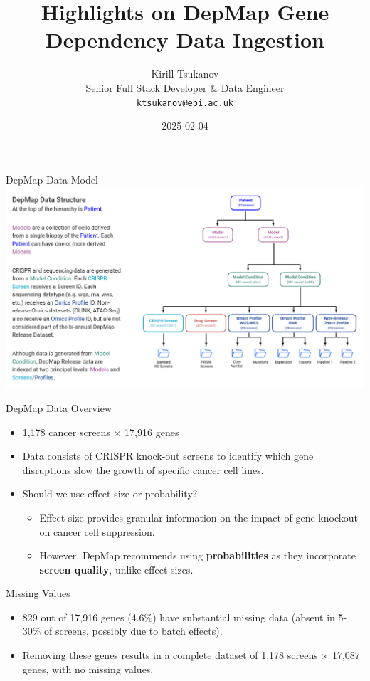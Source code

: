 \documentclass[handout]{beamer}
\title{Highlights on DepMap Gene Dependency Data Ingestion}
\date{2025-02-04}
\author{Kirill Tsukanov \\ Senior Full Stack Developer \& Data Engineer \\ \texttt{ktsukanov@ebi.ac.uk}}
\institute{Perturbation Catalogue WP1/2/3 Technical Meeting}
\begin{document}
\begin{frame}
    \titlepage
\end{frame}

\begin{frame}{DepMap Data Model}
    \centering
    \includegraphics[width=0.9\linewidth]{depmap_data_model.png}
\end{frame}

\begin{frame}{DepMap Data Overview}
    \begin{itemize}
        \item 1,178 cancer screens \(\times\) 17,916 genes
        \item Data consists of CRISPR knock-out screens to identify which gene disruptions slow the growth of specific cancer cell lines.
        \item Should we use effect size or probability?
        \begin{itemize}
            \item Effect size provides granular information on the impact of gene knockout on cancer cell suppression.
            \item However, DepMap recommends using \textbf{probabilities} as they incorporate \textbf{screen quality}, unlike effect sizes.
        \end{itemize}
    \end{itemize}
\end{frame}

\begin{frame}{Missing Values}
    \begin{itemize}
        \item 829 out of 17,916 genes (4.6\%) have substantial missing data (absent in 5-30\% of screens, possibly due to batch effects).
        \item Removing these genes results in a complete dataset of 1,178 screens \(\times\) 17,087 genes, with no missing values.
    \end{itemize}
\end{frame}
\end{document}
